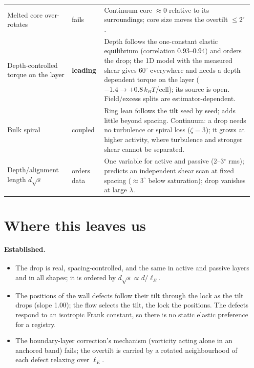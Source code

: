 \documentclass[11pt,a4paper]{article}
\newcommand{\kT}{k_BT}
\begin{document}
\begin{center}
\begin{tabular}{p{4.3cm}p{2cm}p{8.4cm}}
Melted core over-rotates & fails & Continuum core $\approx0$ relative to its surroundings; core size moves the overtilt $\le2^\circ$. \\
Depth-controlled torque on the layer & \textbf{leading} & Depth follows the one-constant elastic equilibrium (correlation 0.93--0.94) and orders the drop; the 1D model with the measured shear gives 60$^\circ$ everywhere and needs a depth-dependent torque on the layer ($-1.4\to+0.8\,\kT$/cell); its source is open. Field/excess splits are estimator-dependent. \\
Bulk spiral & coupled & Ring lean follows the tilt seed by seed; adds little beyond spacing. Continuum: a drop needs no turbulence or spiral loss ($\zeta=3$); it grows at higher activity, where turbulence and stronger shear cannot be separated. \\
Depth/alignment length $d\sqrt{s}$ & orders data & One variable for active and passive (2--3$^\circ$ rms); predicts an independent shear scan at fixed spacing ($\approx3^\circ$ below saturation); drop vanishes at large $\lambda$. \\
\bottomrule
\end{tabular}
\end{center}

\section{Where this leaves us}\label{sec:leaves}

\paragraph{Established.}
\begin{itemize}
\item The drop is real, spacing-controlled, and the same in active and passive layers and in all shapes; it is ordered by $d\sqrt{s}\propto d/\ell_E$.
\item The positions of the wall defects follow their tilt through the lock as the tilt drops (slope 1.00); the flow selects the tilt, the lock the
positions. The defects respond to an isotropic Frank constant, so there is no static elastic preference for a registry.
\item The boundary-layer correction's mechanism (vorticity acting alone in an anchored band) fails; the overtilt is carried by a rotated neighbourhood
of each defect relaxing over $\ell_E$.
\end{itemize}
\end{document}
